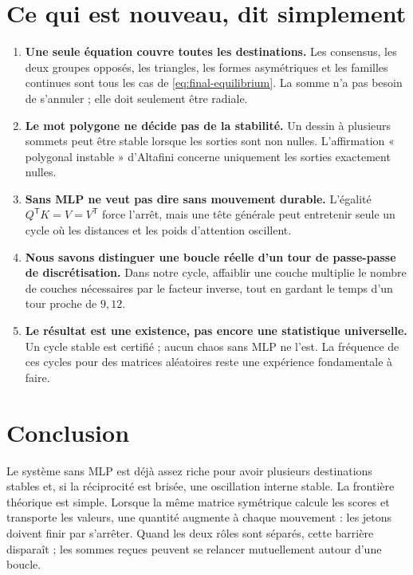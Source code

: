 \documentclass[11pt,a4paper]{article}
\theoremstyle{definition}
\newcommand{\T}{\mathsf T}
\begin{document}
\section{Ce qui est nouveau, dit simplement}
\label{sec:new}

\begin{enumerate}
  \item \textbf{Une seule équation couvre toutes les destinations.} Les consensus, les
  deux groupes opposés, les triangles, les formes asymétriques et les familles continues
  sont tous les cas de \eqref{eq:final-equilibrium}. La somme n'a pas besoin de s'annuler ;
  elle doit seulement être radiale.

  \item \textbf{Le mot polygone ne décide pas de la stabilité.} Un dessin à plusieurs
  sommets peut être stable lorsque les sorties sont non nulles. L'affirmation
  « polygonal instable » d'Altafini concerne uniquement les sorties exactement nulles.

  \item \textbf{Sans MLP ne veut pas dire sans mouvement durable.} L'égalité
  $Q^{\T}K=V=V^{\T}$ force l'arrêt, mais une tête générale peut entretenir seule un cycle
  où les distances et les poids d'attention oscillent.

  \item \textbf{Nous savons distinguer une boucle réelle d'un tour de passe-passe de
  discrétisation.} Dans notre cycle, affaiblir une couche multiplie le nombre de couches
  nécessaires par le facteur inverse, tout en gardant le temps d'un tour proche de
  $9{,}12$.

  \item \textbf{Le résultat est une existence, pas encore une statistique universelle.}
  Un cycle stable est certifié ; aucun chaos sans MLP ne l'est. La fréquence de ces cycles
  pour des matrices aléatoires reste une expérience fondamentale à faire.
\end{enumerate}

\section{Conclusion}

Le système sans MLP est déjà assez riche pour avoir plusieurs destinations stables et,
si la réciprocité est brisée, une oscillation interne stable. La frontière théorique est
simple. Lorsque la même matrice symétrique calcule les scores et transporte les valeurs,
une quantité augmente à chaque mouvement : les jetons doivent finir par s'arrêter. Quand
les deux rôles sont séparés, cette barrière disparaît ; les sommes reçues peuvent se
relancer mutuellement autour d'une boucle.
\end{document}
